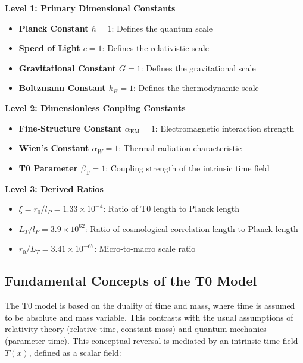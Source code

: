 \documentclass[12pt,a4paper]{article}
\newcommand{\Tfield}{T(x)}
\newcommand{\alphaEM}{\alpha_{\text{EM}}}
\newcommand{\betaT}{\beta_{\text{T}}}
\begin{document}
	\begin{tcolorbox}[colback=blue!5!white,colframe=blue!75!black,title=Hierarchical Levels of Constants]
		\textbf{Level 1: Primary Dimensional Constants}
		\begin{itemize}
			\item \textbf{Planck Constant $\hbar = 1$}: Defines the quantum scale
			\item \textbf{Speed of Light $c = 1$}: Defines the relativistic scale
			\item \textbf{Gravitational Constant $G = 1$}: Defines the gravitational scale
			\item \textbf{Boltzmann Constant $k_B = 1$}: Defines the thermodynamic scale
		\end{itemize}
		
		\textbf{Level 2: Dimensionless Coupling Constants}
		\begin{itemize}
			\item \textbf{Fine-Structure Constant $\alphaEM = 1$}: Electromagnetic interaction strength
			\item \textbf{Wien’s Constant $\alpha_W = 1$}: Thermal radiation characteristic
			\item \textbf{T0 Parameter $\betaT = 1$}: Coupling strength of the intrinsic time field
		\end{itemize}
		
		\textbf{Level 3: Derived Ratios}
		\begin{itemize}
			\item \textbf{$\xi = r_0/l_P = 1.33 \times 10^{-4}$}: Ratio of T0 length to Planck length
			\item \textbf{$L_T/l_P = 3.9 \times 10^{62}$}: Ratio of cosmological correlation length to Planck length
			\item \textbf{$r_0/L_T = 3.41 \times 10^{-67}$}: Micro-to-macro scale ratio
		\end{itemize}
	\end{tcolorbox}
	
	\subsection{Fundamental Concepts of the T0 Model}
	
	The T0 model is based on the duality of time and mass, where time is assumed to be absolute and mass variable. This contrasts with the usual assumptions of relativity theory (relative time, constant mass) and quantum mechanics (parameter time). This conceptual reversal is mediated by an intrinsic time field $\Tfield$, defined as a scalar field:
	
\end{document}
